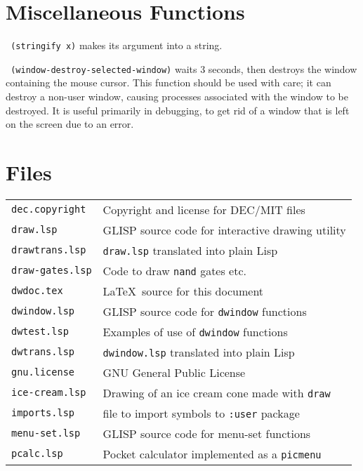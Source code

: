 \section{Miscellaneous Functions}

{\tt \hspace*{0.5in} (stringify x)} makes its argument into a string.

{\tt \hspace*{0.5in} (window-destroy-selected-window)} waits 3 seconds,
then destroys the window containing the mouse cursor.  This function
should be used with care; it can destroy a non-user window, causing
processes associated with the window to be destroyed.  It is useful
primarily in debugging, to get rid of a window that is left on the screen
due to an error.


\section{Files}

\begin{tabular}{ll}
{\tt dec.copyright}  & Copyright and license for DEC/MIT files \\
{\tt draw.lsp}       & GLISP source code for interactive drawing utility \\
{\tt drawtrans.lsp}  & {\tt draw.lsp} translated into plain Lisp \\
{\tt draw-gates.lsp} & Code to draw {\tt nand} gates etc. \\
{\tt dwdoc.tex}      & \LaTeX \ source for this document \\
{\tt dwindow.lsp}    & GLISP source code for {\tt dwindow} functions \\
{\tt dwtest.lsp}     & Examples of use of {\tt dwindow} functions \\
{\tt dwtrans.lsp}    & {\tt dwindow.lsp} translated into plain Lisp \\
{\tt gnu.license}    & GNU General Public License \\
{\tt ice-cream.lsp}  & Drawing of an ice cream cone made with {\tt draw} \\
{\tt imports.lsp}    & file to import symbols to {\tt :user} package \\
{\tt menu-set.lsp}   & GLISP source code for menu-set functions \\
{\tt pcalc.lsp}      & Pocket calculator implemented as a {\tt picmenu} \\
\end{tabular}



